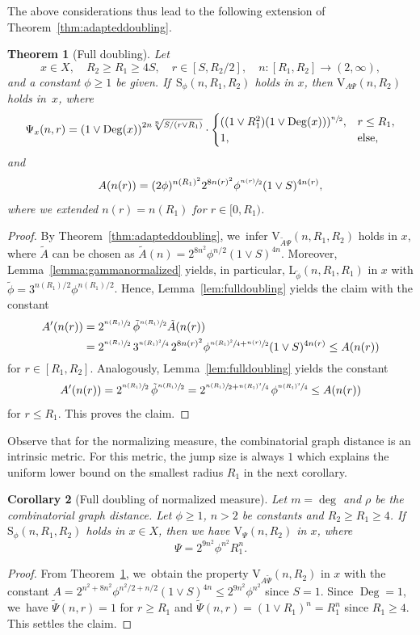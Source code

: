 \documentclass[10pt]{amsart}
\newcommand{\rS}{\mathrm{S}}
\newcommand{\rV}{\mathrm{V}}
\newcommand{\rL}{\mathrm{L}}
\theoremstyle{plain}
\newtheorem{theorem}{Theorem}[section]
\newtheorem{corollary}[theorem]{Corollary}
\theoremstyle{definition}
\DeclareMathOperator{\Deg}{Deg}
\begin{document}
The above considerations thus lead to the following extension of Theorem~\ref{thm:adapteddoubling}.
\begin{theorem}[Full doubling]\label{thm:fulldoubling}
Let
\[
x\in X,\quad R_2\geq R_1\geq 4S,\quad r\in[S,R_2/2],\quad n:[R_{1},R_{2}]\to (2,\infty),
\]
and a constant $\phi\geq1$ be given. If~$\rS_\phi(n,R_1,R_2)$ holds in $x$, then $\rV_{\!A\Psi}(n,R_2) $ holds in~$x$, where
\[
\Psi_x(n,r)
=\left(1\vee\Deg(x)\right)^{{2}n\sqrt[n]{S/(r\vee R_1)}}
\cdot\begin{cases}
((1\vee R_1^{2})(1\vee\Deg(x)))^{\sfrac{n}{2}},& r\leq R_1,
\\
1,& \text{else,}
\end{cases}
\]
and
\[
A(n(r))=(2\phi)^{{n(R_1)^2} }2^{8n(r)^2}\phi^{\sfrac{n(r)}2}(1\vee S)^{4n(r)},
\]
where we extended $ n(r)=n(R_{1}) $ for $ r\in [0,R_{1}) $.
\end{theorem}
\begin{proof}
By Theorem~\ref{thm:adapteddoubling}, we~infer {$\rV_{\!\tilde A\Psi}(n,R_1,R_2) $ holds in $x$, where $\tilde A$ can be chosen as $\tilde A(n)=2^{{8}n^2}\phi^{n{/2}}(1\vee S)^{{4}n}$}. Moreover, Lemma~\ref{lemma:gammanormalized} yields, in particular, $\rL_{\tilde \phi}(n,R_1,R_1)$ in $x$ with $\tilde\phi={3}^{n(R_{1})/2}\phi^{n(R_{1})/2}$. Hence, Lemma~\ref{lem:fulldoubling} yields the claim with the constant
\begin{align*}
A'(n(r))&=2^{\sfrac{n(R_{1})}{2}}\,\tilde\phi^{\sfrac{n(R_{1})}{2}}\tilde A(n(r))\\
&=2^{\sfrac{n(R_1)}{2}}\,3^{\sfrac{n(R_1)^2}{4}}\,2^{8n(r)^2}\phi^{\sfrac{n(R_1)^2}{4}+\sfrac{n(r)}{2}}(1\vee S)^{{4}n(r)}\leq A(n(r))
\end{align*}
for $r\in[R_1,R_2]$. Analogously,
Lemma~\ref{lem:fulldoubling} yields the constant
\[
A'(n(r)) = 2^{\sfrac{n(R_{1})}{2}}\,\tilde\phi^{\sfrac{n(R_{1})}{2}}= 2^{\sfrac{n(R_1)}{2}+\sfrac{n(R_1)^2}{4}}\, \phi^{\sfrac{n(R_1)^2}{4}}\leq A(n(r))
\]
for $ r\leq R_{1} $. This proves the claim.
\end{proof}

Observe that for the normalizing measure, the combinatorial graph distance is an intrinsic metric. For this metric, the jump size is always $ 1 $ which explains the uniform lower bound on the smallest radius $ R_{1} $ in the next corollary.

\begin{corollary}[Full doubling of normalized measure]\label{cor:adapteddoubling} Let $m=\deg$ and $ \rho $ be the combinatorial graph distance. Let $\phi\geq 1$, $ n>2 $ be constants and $R_2\geq R_1\geq 4$. If~$\rS_{\phi}(n, R_1,R_2)$ holds in $x\in X$, then we have $\rV_{{\Psi}}(n, R_2)$ in $x$,
where
\[
\Psi = 2^{9n^2}\phi^{n^2} R_1^n.
\]
\end{corollary}
\begin{proof}
From Theorem~\ref{thm:fulldoubling}, we~obtain the property $\rV_{\!A{\tilde \Psi}}(n,R_{2}) $ in $x$ with the constant $ A=2^{{n^2}+8n^2}\phi^{n^2/2+n/2}(1\vee S)^{4n}\leq 2^{9n^2}\phi^{n^2} $ since $ S=1 $.
Since $ \Deg =1 $, we~have $ \tilde \Psi(n,r)=1 $ for $ r\ge R_1 $ and $ \tilde\Psi(n,r) =(1\vee R_{1})^{n}=R_{1}^{n}$ since $ R_{1}\ge 4 $. This settles the claim.
\end{proof}
\end{document}

